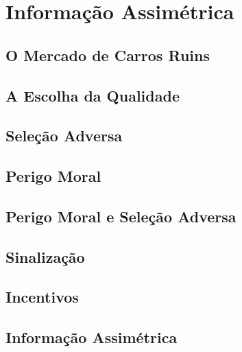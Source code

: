 \documentclass[a4paper,11pt,oneside]{book}
\theoremstyle{definition}
\theoremstyle{break}
\begin{document}
\chapter{Informação Assimétrica}

\section{O Mercado de Carros Ruins}
\section{A Escolha da Qualidade}
\section{Seleção Adversa}
\section{Perigo Moral}
\section{Perigo Moral e Seleção Adversa}
\section{Sinalização}
\section{Incentivos}
\section{Informação Assimétrica}
\end{document}
